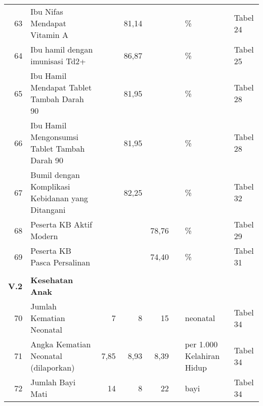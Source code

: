 \begin{small}
\begin{longtable}{rY{12em}rrrrY{5em}Y{5em}}
	 63 & Ibu Nifas Mendapat Vitamin A                                                &        &  81,14 &                    &          & \%                             & Tabel 24 \\
	 64 & Ibu hamil dengan imunisasi Td2+                                             &        &  86,87 &                    &          & \%                             & Tabel 25 \\
	 65 & Ibu Hamil Mendapat Tablet Tambah Darah 90                                   &        &  81,95 &                    &          & \%                             & Tabel 28 \\
	 66 & Ibu Hamil Mengonsumsi Tablet Tambah Darah 90                                &        &  81,95 &                    &          & \%                             & Tabel 28 \\
	 67 & Bumil dengan Komplikasi Kebidanan yang Ditangani                            &        &  82,25 &                    &          & \%                             & Tabel 32 \\
	 68 & Peserta KB Aktif Modern                                                     &        &        &              78,76 &          & \%                             & Tabel 29 \\
	 69 & Peserta KB Pasca Persalinan                                                 &        &        &              74,40 &          & \%                             & Tabel 31 \\
	 &                                                                                &        &        &                    &          &                                &          \\
	\textbf{V.2} & \textbf{Kesehatan Anak}                                            &        &        &                    &          &                                &          \\
	 70 & Jumlah Kematian Neonatal                                                    &      7 &      8 &                 15 &          & neonatal                       & Tabel 34 \\
	 71 & Angka Kematian Neonatal (dilaporkan)                                        &   7,85 &   8,93 &               8,39 &          & per 1.000 Kelahiran Hidup      & Tabel 34 \\
	 72 & Jumlah Bayi Mati                                                            &     14 &      8 &                 22 &          & bayi                           & Tabel 34 \\

\end{longtable}
\end{small}
